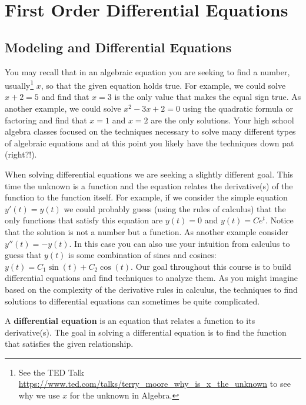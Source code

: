 \chapter{First Order Differential Equations}
\section{Modeling and Differential Equations}
You may recall that in an algebraic equation you are seeking to find a number,
usually\footnote{See the TED Talk
    \href{https://www.ted.com/talks/terry_moore_why_is_x_the_unknown}{https://www.ted.com/talks/terry\_moore\_why\_is\_x\_the\_unknown}
to see why we use $x$ for the unknown in Algebra.}
$x$, so that the given equation holds true.  For example, we could solve $x+2 = 5$ and
find that $x=3$ is the only value that makes the equal sign true.  As another example, we
could solve $x^2-3x+2 = 0$ using the quadratic formula or factoring and find that $x=1$
and $x=2$ are the only solutions. Your high school algebra classes focused on the
techniques necessary to solve many different types of algebraic equations and at this
point you likely have the techniques down pat (right?!).

When solving differential equations we are seeking a slightly different goal.  This time
the unknown is a function and the equation relates the derivative(s) of the function to
the function itself.  For example, if we consider the simple equation $y'(t) = y(t)$ we could
probably guess (using the rules of calculus) that the only functions that satisfy this
equation are $y(t) = 0$ and $y(t) = Ce^t$.  Notice that the solution is not a number but a
function.  As another example consider $y''(t) = -y(t)$.  In this case you can also use
your intuition from calculus to guess that $y(t)$ is some combination of sines and
cosines: $y(t) = C_1 \sin(t) + C_2 \cos(t)$. Our goal throughout this course is to build
differential equations and find techniques to analyze them. As you might imagine based on
the complexity of the derivative rules in calculus, the techniques to find solutions to
differential equations can sometimes be quite complicated.

\begin{definition}
    A {\bf differential equation} is an equation that relates a function to its
    derivative(s).  The goal in solving a differential equation is to find the function
    that satisfies the given relationship.
\end{definition}

